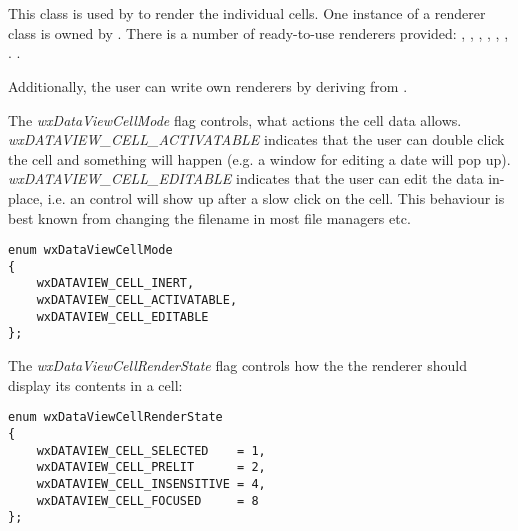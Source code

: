 
\section{}\label{wxdataviewrenderer}


This class is used by  to
render the individual cells. One instance of a renderer class is
owned by . There is
a number of ready-to-use renderers provided:
,
,
,
,
,
,
.
.

Additionally, the user can write own renderers by deriving from
.

The {\it wxDataViewCellMode} flag controls, what actions
the cell data allows. {\it wxDATAVIEW\_CELL\_ACTIVATABLE}
indicates that the user can double click the cell and
something will happen (e.g. a window for editing a date
will pop up). {\it wxDATAVIEW\_CELL\_EDITABLE} indicates
that the user can edit the data in-place, i.e. an control
will show up after a slow click on the cell. This behaviour
is best known from changing the filename in most file 
managers etc.



{\small
\begin{verbatim}
enum wxDataViewCellMode
{
    wxDATAVIEW_CELL_INERT,
    wxDATAVIEW_CELL_ACTIVATABLE,
    wxDATAVIEW_CELL_EDITABLE
};
\end{verbatim}
}

The {\it wxDataViewCellRenderState} flag controls how the
the renderer should display its contents in a cell:

{\small
\begin{verbatim}
enum wxDataViewCellRenderState
{
    wxDATAVIEW_CELL_SELECTED    = 1,
    wxDATAVIEW_CELL_PRELIT      = 2,
    wxDATAVIEW_CELL_INSENSITIVE = 4,
    wxDATAVIEW_CELL_FOCUSED     = 8
};
\end{verbatim}
}



